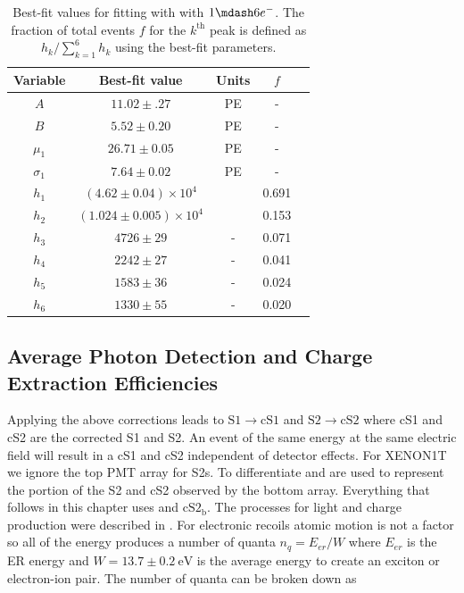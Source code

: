 \begin{table}
\centering
\begin{tabular}{ccccc}
\hline
Variable & Best-fit value & Units & $f$ \\
\hline
$A$ & $11.02 \pm .27$ & PE & - \\
$B$ & $5.52 \pm 0.20$ & PE & - \\
$\mu_1$ & $26.71 \pm 0.05$ & PE & - \\
$\sigma_1$ & $7.64 \pm 0.02$ & PE & - \\
$h_1$ & $(4.62 \pm 0.04) \times 10^4$ & & 0.691 \\
$h_2$ & $(1.024 \pm 0.005) \times 10^4$ & & 0.153 \\
$h_3$ & $4726 \pm 29$ & - & 0.071 \\
$h_4$ & $2242 \pm 27$ & - & 0.041 \\
$h_5$ & $1583 \pm 36$ & - & 0.024 \\
$h_6$ & $1330 \pm 55$ & - & 0.020 \\
\hline
\hline
\end{tabular}
\caption{Best-fit values for fitting  with
 with $1 \mdash 6 e^-$.  The fraction of total events $f$ for the $k^{\mathrm{th}}$ peak is
defined as $h_k / \sum_{k = 1}^{6} h_k$ using the best-fit parameters.}
\label{tab:det_char_single_electron_gain_vals}
\end{table}



\subsection{Average Photon Detection and Charge Extraction Efficiencies}
\label{subsec:det_char_photon_charge_efficiencies}
Applying the above corrections leads to $\mathrm{S1} \rightarrow \mathrm{cS1}$ and $\mathrm{S2} \rightarrow \mathrm{cS2}$ where cS1 and
cS2 are the corrected S1 and S2.  An event of the same energy at the same electric field will result in a cS1 and cS2 independent of
detector effects.  For XENON1T we ignore the top PMT array for S2s.  To differentiate \stwob and \cstwob are used to represent the portion
of the S2 and cS2 observed by the bottom array.  Everything that follows in this chapter uses \stwob and $\mathrm{cS2_b}$.  The processes
for light and charge production were described in .  For electronic recoils atomic motion is
not a factor so all of the energy produces a number of quanta $n_q = E_{er} / W$ where $E_{er}$ is the ER energy and
$W = 13.7 \pm 0.2\ \mathrm{eV}$ is the average energy to create an exciton or electron-ion pair.  The number of quanta can be broken
down as

